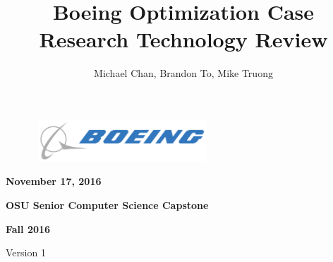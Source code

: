 \documentclass[a4,draftclsnofoot,onecolumn,margin=0.75,10pt]{IEEEtran}
\author{Michael Chan, Brandon To, Mike Truong}
\begin{document}


\title{Boeing Optimization Case Research Technology Review{}}
\maketitle{}


{\centering{}\bfseries\color{black}
\includegraphics[width=3.4362in,height=0.6134in]{Boeing-Logo.png} %
\par}


\begin{figure}
\centering
\end{figure}



{\centering{}\bfseries\color{black}
November 17, 2016
\par}

{\centering{}\bfseries\color{black}
OSU Senior Computer Science Capstone
\par}

{\centering{}\bfseries\color{black}
Fall 2016

Version 1
\par}

\bigskip
\end{document}
